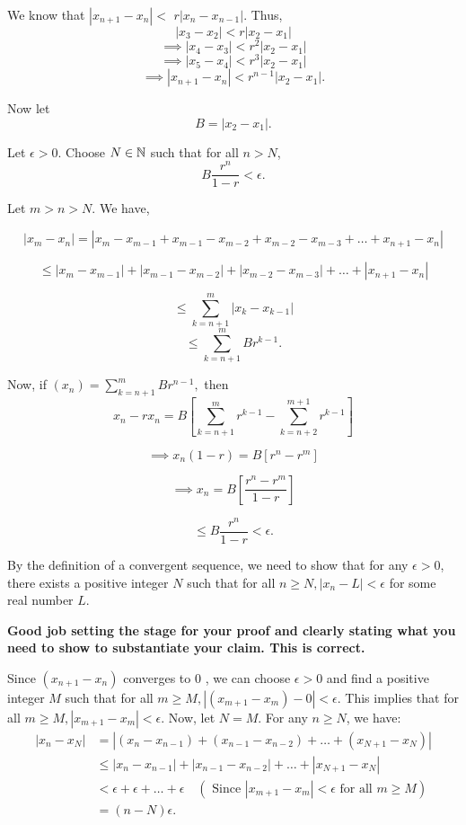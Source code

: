 \documentclass{report}
\begin{document}
\begin{myproof}
We know that $\left|x_{n+1}-x_n\right|<$ $r\left|x_n-x_{n-1}\right|.$ Thus, $$\left|x_{3}-x_2\right|< r\left|x_2-x_{1}\right|$$
$$ \implies \left|x_{4}-x_3\right|< r^2\left|x_2-x_{1}\right|$$
$$ \implies \left|x_{5}-x_4\right|< r^3\left|x_2-x_{1}\right|$$
$$ \implies \left|x_{n+1}-x_n\right|< r^{n-1}\left|x_2-x_{1}\right|.$$


Now let 
$$B=\left|x_{2}-x_1\right|.$$

Let $\epsilon > 0.$ Choose $N\in\NN$ such that for all $n > N$, $$B\frac{ r^{n}}{1-r} < \epsilon.$$

Let $m > n > N.$ We have,

$$|x_m - x_n|= |x_m - x_{m-1} + x_{m-1} - x_{m-2}  + x_{m-2} - x_{m-3}+ \dots+ x_{n+1} -  x_{n}| $$

$$\leq |x_m - x_{m-1}| + |x_{m-1} - x_{m-2}|  + 
|x_{m-2} -  x_{m-3}| + \dots + | x_{n+1} -  x_{n}| $$

$$ \leq \sum_{k={n+1}}^m |x_k - x_{k-1}|$$
$$ \leq \sum_{k={n+1}}^{m}B r^{k-1}.$$


Now, if $(x_n)= \sum_{k={n+1}}^{m}Br^{n-1}, $ then
$$x_n - rx_n = B\left[\sum_{k={n+1}}^{m}r^{k-1} - \sum_{k={n+2}}^{m+1}r^{k-1}\right]$$

$$\implies x_n(1 - r) = B\left[r^n - r^{m}\right] $$

$$\implies x_n = B\left[\frac{r^n - r^{m}}{1 - r}\right] $$

$$\leq B\frac{r^n}{1 - r}  < \epsilon.$$

\end{myproof}
\pagebreak

By the definition of a convergent sequence, we need to show that for any $\epsilon>0$, there exists a positive integer $N$ such that for all $n \geq N,\left|x_n-L\right|<\epsilon$ for some real number $L$.

\textbf{Good job setting the stage for your proof and clearly stating what you need to show to substantiate your claim. This is correct.}

Since $\left(x_{n+1}-x_n\right)$ converges to 0 , we can choose $\epsilon>0$ and find a positive integer $M$ such that for all $m \geq M,\left|\left(x_{m+1}-x_m\right)-0\right|<\epsilon$. This implies that for all $m \geq M,\left|x_{m+1}-x_m\right|<\epsilon$.
Now, let $N=M$. For any $n \geq N$, we have:
$$
\begin{aligned}
\left|x_n-x_N\right| & =\left|\left(x_n-x_{n-1}\right)+\left(x_{n-1}-x_{n-2}\right)+\ldots+\left(x_{N+1}-x_N\right)\right| \\
& \leq\left|x_n-x_{n-1}\right|+\left|x_{n-1}-x_{n-2}\right|+\ldots+\left|x_{N+1}-x_N\right| \\
& <\epsilon+\epsilon+\ldots+\epsilon \quad\left(\text { Since }\left|x_{m+1}-x_m\right|<\epsilon \text { for all } m \geq M\right) \\
& =(n-N) \epsilon .
\end{aligned}
$$
\end{document}
